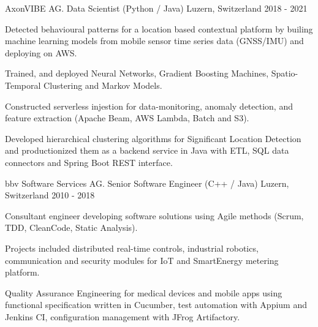 

\begin{cventries}

  \cventry
    {AxonVIBE AG.} %
    {Data Scientist (Python / Java)} %
    {Luzern, Switzerland} %
    {2018 - 2021} %
    {
      \begin{cvitems} %
        \item {
            Detected behavioural patterns for a location based contextual platform 
            by builing machine learning models from mobile sensor time series data 
            (GNSS/IMU) and deploying on AWS.}
        \item {
            Trained, and deployed Neural Networks, Gradient Boosting Machines, Spatio-Temporal 
            Clustering and Markov Models.}
        \item {
            Constructed serverless injestion for data-monitoring, anomaly detection, 
            and feature extraction (Apache Beam, AWS Lambda, Batch and S3).}
        \item {
            Developed hierarchical clustering algorithms for Significant Location Detection 
            and productionized them
            as a backend service in Java with ETL, SQL data connectors and Spring Boot REST interface.}
      \end{cvitems}
    }

\cventry
{bbv Software Services AG.} %
{Senior Software Engineer (C++ / Java)} %
{Luzern, Switzerland} %
{2010 - 2018} %
{
  \begin{cvitems} %
    \item {
        Consultant engineer developing software solutions using 
        Agile methods (Scrum, TDD, CleanCode, Static Analysis).}
      \item{
        Projects included distributed real-time 
        controls, industrial robotics, communication and security modules 
        for IoT and SmartEnergy metering platform.}
    \item {
        Quality Assurance Engineering for medical devices and mobile apps
        using functional specification written in Cucumber, test automation with Appium
        and Jenkins CI, configuration management with JFrog Artifactory. 
        }
  \end{cvitems}
}


\end{cventries}
